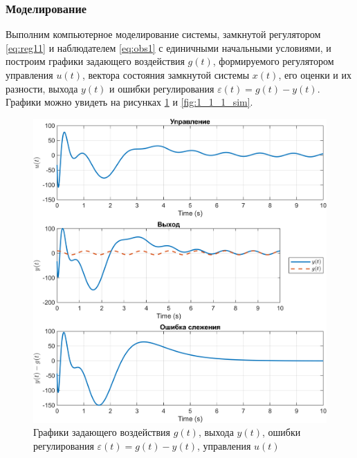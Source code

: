 \subsubsection{Моделирование}

Выполним компьютерное моделирование системы, замкнутой регулятором
\eqref{eq:reg11} и наблюдателем \eqref{eq:obs1} с единичными начальными условиями, 
и построим графики задающего воздействия $g(t)$, формируемого 
регулятором управления $u(t)$, вектора состояния замкнутой системы $x(t)$, его оценки и их разности, выхода
$y(t)$ и ошибки регулирования $\varepsilon(t) = g(t) - y(t)$. Графики можно
увидеть на рисунках \ref{fig:1_1_0_sim} и \ref{fig:1_1_1_sim}.

\begin{figure}[H]
    \centering
    \includegraphics[width=\linewidth]{figs/1_1_0_sim.png}
    \caption{Графики задающего воздействия $g(t)$, выхода
    $y(t)$, ошибки регулирования $\varepsilon(t) = g(t) - y(t)$,
    управления $u(t)$}
    \label{fig:1_1_0_sim}
\end{figure}

